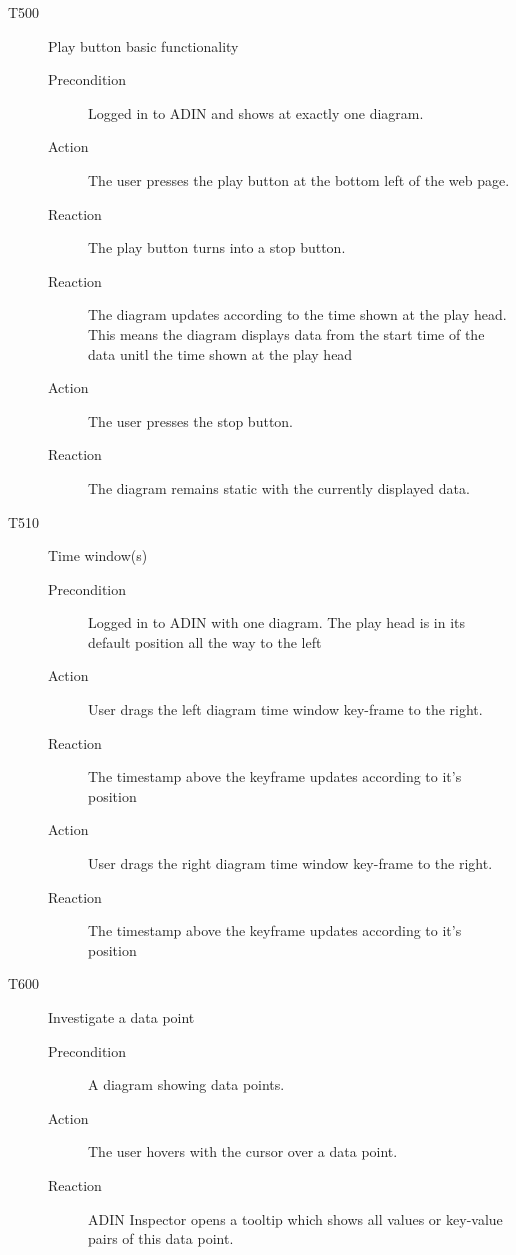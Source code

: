 \documentclass[twoside, english, final]{Pflichtenheft}
\begin{document}
\begin{description}
	\item[T500] Play button basic functionality
	      \begin{description}
		      \item[Precondition]
		            Logged in to ADIN and shows at exactly one diagram.
		      \item[Action]
		            The user presses the play button at the bottom left of the web page.
		      \item[Reaction]
		            The play button turns into a stop button.
		      \item[Reaction]
		            The diagram updates according to the time shown at the play head. This means the diagram displays data from the start time of the data unitl the time shown at the play head
		      \item[Action]
		            The user presses the stop button.
		      \item[Reaction]
		            The diagram remains static with the currently displayed data.
	      \end{description}

	\item[T510] Time window(s)
	      \begin{description}
		      \item[Precondition]
		            Logged in to ADIN with one diagram. The play head is in its default position all the way to the left
		      \item[Action]
		            User drags the left diagram time window key-frame to the right.
		      \item[Reaction]
		            The timestamp above the keyframe updates according to it's position
		      \item[Action]
		            User drags the right diagram time window key-frame to the right.
		      \item[Reaction]
		            The timestamp above the keyframe updates according to it's position
	      \end{description}

	\item[T600] Investigate a data point
	      \begin{description}
		      \item[Precondition]
		            A diagram showing data points.
		      \item[Action]
		            The user hovers with the cursor over a data point.
		      \item[Reaction]
		            ADIN Inspector opens a tooltip which shows all values or key-value pairs of this data point.
	      \end{description}


\end{description}
\end{document}
